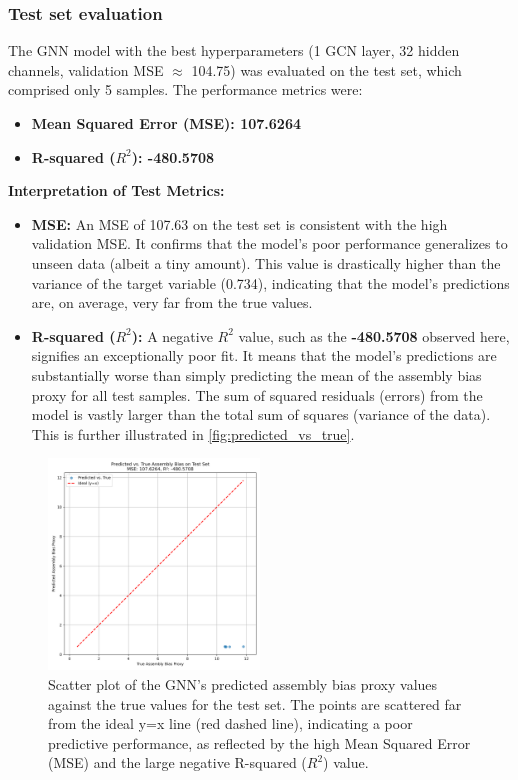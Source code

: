 \documentclass[twocolumn]{aastex631}
\begin{document}
\subsubsection{Test set evaluation}
The GNN model with the best hyperparameters (1 GCN layer, 32 hidden channels, validation MSE $\approx$ 104.75) was evaluated on the test set, which comprised only 5 samples. The performance metrics were:
\begin{itemize}
    \item \textbf{Mean Squared Error (MSE): 107.6264}
    \item \textbf{R-squared ($R^2$): -480.5708}
\end{itemize}

\textbf{Interpretation of Test Metrics:}
\begin{itemize}
    \item \textbf{MSE:} An MSE of 107.63 on the test set is consistent with the high validation MSE. It confirms that the model's poor performance generalizes to unseen data (albeit a tiny amount). This value is drastically higher than the variance of the target variable (0.734), indicating that the model's predictions are, on average, very far from the true values.
    \item \textbf{R-squared ($R^2$):} A negative $R^2$ value, such as the \textbf{-480.5708} observed here, signifies an exceptionally poor fit. It means that the model's predictions are substantially worse than simply predicting the mean of the assembly bias proxy for all test samples. The sum of squared residuals (errors) from the model is vastly larger than the total sum of squares (variance of the data). This is further illustrated in \autoref{fig:predicted_vs_true}.
\end{itemize}

\begin{figure}[htbp]
    \centering
    \includegraphics[width=0.5\textwidth]{../input_files/plots/predicted_vs_true_bias_plot_2_1748137938.png}
    \caption{\label{fig:predicted_vs_true}Scatter plot of the GNN's predicted assembly bias proxy values against the true values for the test set. The points are scattered far from the ideal y=x line (red dashed line), indicating a poor predictive performance, as reflected by the high Mean Squared Error (MSE) and the large negative R-squared ($R^2$) value.}
\end{figure}
\end{document}

